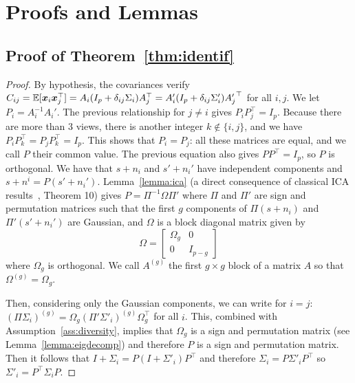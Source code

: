 \section{Proofs and Lemmas}
\subsection{Proof of Theorem~\ref{thm:identif}}
\label{proof:identif}
\begin{proof}
By hypothesis, the covariances verify $C_{ij} =\mathbb{E}[\boldsymbol{x}_i\boldsymbol{x}_j^\top] = A_i(I_p + \delta_{ij}\Sigma_i)A_j^{\top} = A'_i(I_p + \delta_{ij}\Sigma'_i){A'_j}^{\top}$ for all $i, j$. We let $P_i=A_i^{-1}A_i'$. The previous relationship for $j\neq i$ gives $P_iP_j^{\top} = I_p$. Because there are more than 3 views, there is another integer $k \notin\{i,j\}$, and we have $P_iP_k^{\top}= P_jP_k^{\top}=I_p$. This shows that $P_i = P_j$: all these matrices are equal, and we call $P$ their common value. The previous equation also gives $PP^{\top} = I_p$, so $P$ is orthogonal. 
%
We have that $s + n_i$ and $s' + n_i'$ have independent components and $s + n^i = P(s' + n_i')$. Lemma~\ref{lemma:ica} (a direct consequence of classical ICA results~\cite{comon1994independent}, Theorem 10) gives $P=\Pi^{-1} \Omega \Pi'$ where $\Pi$ and $\Pi'$ are sign and permutation matrices such that the first $g$ components of $\Pi(s + n_i)$ and $\Pi'(s' + n_i')$ are Gaussian, and $\Omega$ is a block diagonal matrix given by
\[
\Omega = \begin{bmatrix} \Omega_g & 0 \\ 0 & I_{p - g} \end{bmatrix}
\]
where $\Omega_g$ is orthogonal.
%
We call $A^{(g)}$ the first $g \times g$ block of a matrix $A$ so that $\Omega^{(g)} = \Omega_g$.

Then, considering only the Gaussian components, we can write for $i=j$:  
$(\Pi \Sigma_i)^{(g)} = \Omega_g (\Pi' \Sigma'_i)^{(g)} \Omega_g^{\top}$ for all $i$. This, combined with Assumption~\ref{ass:diversity}, implies that $\Omega_g$ is a sign and permutation matrix (see Lemma~\ref{lemma:eigdecomp}) and therefore $P$ is a sign and permutation matrix. Then it follows that $I + \Sigma_i = P(I + \Sigma'_i)P^{\top}$ and therefore $\Sigma_i = P \Sigma'_i P^{\top}$ so $\Sigma'_i = P^{\top} \Sigma_i P$.
\end{proof}

